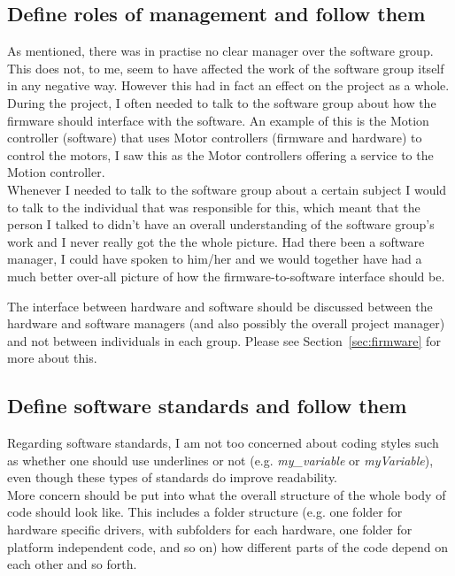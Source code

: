 \subsection{Define roles of management and follow them}\label{sec:roles}
As mentioned, there was in practise no clear manager over the software group. This does not, to me, seem to have affected the work of the software group itself in any negative way. However this had in fact an effect on the project as a whole. \\
During the project, I often needed to talk to the software group about how the firmware should interface with the software. An example of this is the Motion controller (software) that uses Motor controllers (firmware and hardware) to control the motors, I saw this as the Motor controllers offering a service to the Motion controller. \\
Whenever I needed to talk to the software group about a certain subject I would to talk to the individual that was responsible for this, which meant that the person I talked to didn't have an overall understanding of the software group's work and I never really got the the whole picture. Had there been a software manager, I could have spoken to him/her and we would together have had a much better over-all picture of how the firmware-to-software interface should be.

The interface between hardware and software should be discussed between the hardware and software managers (and also  possibly the overall project manager) and not between individuals in each group. Please see Section~\ref{sec:firmware} for more about this.


\subsection{Define software standards and follow them}\label{sec:software_standards}
Regarding software standards, I am not too concerned about coding styles such as whether one should use underlines or not (e.g. \emph{my\_variable} or \emph{myVariable}), even though these types of standards do improve readability. \\
More concern should be put into what the overall structure of the whole body of code should look like. This includes a folder structure (e.g. one folder for hardware specific drivers, with subfolders for each hardware, one folder for platform independent code, and so on) how different parts of the code depend on each other and so forth.

